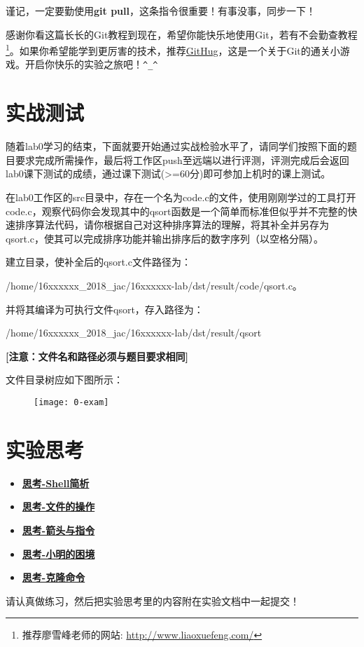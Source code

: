 谨记，一定要勤使用\textbf{git pull}，这条指令很重要！有事没事，同步一下！

感谢你看这篇长长的Git教程到现在，希望你能快乐地使用Git，若有不会勤查教程\footnote{推荐廖雪峰老师的网站:
\url{http://www.liaoxuefeng.com/}}。如果你希望能学到更厉害的技术，推荐\href{https://github.com/Gazler/githug}{GitHug}，这是一个关于Git的通关小游戏。开启你快乐的实验之旅吧！\verb|^_^|

\section{实战测试}
随着lab0学习的结束，下面就要开始通过实战检验水平了，请同学们按照下面的题目要求完成所需操作，最后将工作区push至远端以进行评测，评测完成后会返回lab0课下测试的成绩，通过课下测试(>=60分)即可参加上机时的课上测试。
\begin{exercise}
在lab0工作区的src目录中，存在一个名为code.c的文件，使用刚刚学过的工具打开code.c，观察代码你会发现其中的qsort函数是一个简单而标准但似乎并不完整的快速排序算法代码，请你根据自己对这种排序算法的理解，将其补全并另存为qsort.c，使其可以完成排序功能并输出排序后的数字序列（以空格分隔）。

建立目录，使补全后的qsort.c文件路径为：

/home/16xxxxxx\_2018\_jac/16xxxxxx-lab/dst/result/code/qsort.c。

并将其编译为可执行文件qsort，存入路径为：

/home/16xxxxxx\_2018\_jac/16xxxxxx-lab/dst/result/qsort

\textbf{[注意：文件名和路径必须与题目要求相同]}

文件目录树应如下图所示：
\end{exercise}
\begin{figure}[htbp]
  \centering
  \texttt{[image: 0-exam]}
\end{figure}

\section{实验思考}
\begin{itemize}
\item \hyperref[think-Shell简析]{\textbf{\textcolor{baseB}{思考-Shell简析}}}
\item \hyperref[think-文件的操作]{\textbf{\textcolor{baseB}{思考-文件的操作}}}
\item \hyperref[think-箭头与指令]{\textbf{\textcolor{baseB}{思考-箭头与指令}}}
\item \hyperref[think-小明的困境]{\textbf{\textcolor{baseB}{思考-小明的困境}}}
\item \hyperref[think-克隆]{\textbf{\textcolor{baseB}{思考-克隆命令}}}
\end{itemize}

请认真做练习，然后把实验思考里的内容附在实验文档中一起提交！
